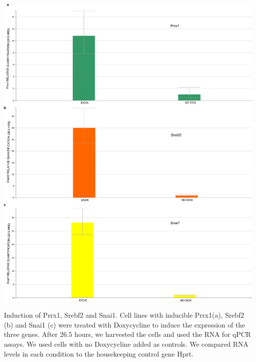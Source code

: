 \begin{suppfigure}[p]  
    \centering
    \includegraphics[width=\linewidth]{figures/hedgehog/SuppFigure15.png}
    \caption[qPCR induction plots for Prrx1, Srebf2 and Snai1]{
        Induction of Prrx1, Srebf2 and Snai1. Cell lines with inducible Prrx1(a), Srebf2 (b) and Snai1 (c) were treated with Doxycycline to induce the expression of the three genes. After 26.5 hours, we harvested the cells and used the RNA for qPCR assays. We used cells with no Doxycycline added as controls. We compared RNA levels in each condition to the housekeeping control gene Hprt.  
    }
    \label{fig:hh_figureS15}
\end{suppfigure}



